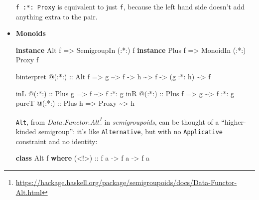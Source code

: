 \documentclass[]{article}
\newenvironment{Shaded}{}{}
\newcommand{\DataTypeTok}[1]{\textcolor[rgb]{0.56,0.13,0.00}{#1}}
\newcommand{\KeywordTok}[1]{\textcolor[rgb]{0.00,0.44,0.13}{\textbf{#1}}}
\newcommand{\NormalTok}[1]{#1}
\newcommand{\OperatorTok}[1]{\textcolor[rgb]{0.40,0.40,0.40}{#1}}
\newcommand{\OtherTok}[1]{\textcolor[rgb]{0.00,0.44,0.13}{#1}}
\renewcommand{\href}[2]{#2\footnote{\url{#1}}}
\begin{document}
\begin{itemize}
  \texttt{f\ :*:\ Proxy} is equivalent to just \texttt{f}, because the left hand
  side doesn't add anything extra to the pair.
\item
  \textbf{Monoids}

\begin{Shaded}
\begin{Highlighting}[]
\KeywordTok{instance} \DataTypeTok{Alt}\NormalTok{  f }\OtherTok{=>} \DataTypeTok{SemigroupIn}\NormalTok{ (}\OperatorTok{:*:}\NormalTok{) f}
\KeywordTok{instance} \DataTypeTok{Plus}\NormalTok{ f }\OtherTok{=>} \DataTypeTok{MonoidIn}\NormalTok{    (}\OperatorTok{:*:}\NormalTok{) }\DataTypeTok{Proxy}\NormalTok{ f}

\NormalTok{binterpret }\OperatorTok{@}\NormalTok{(}\OperatorTok{:*:}\NormalTok{)}
\OtherTok{    ::} \DataTypeTok{Alt}\NormalTok{ f}
    \OtherTok{=>}\NormalTok{ g }\OperatorTok{\textasciitilde{}>}\NormalTok{ f}
    \OtherTok{{-}>}\NormalTok{ h }\OperatorTok{\textasciitilde{}>}\NormalTok{ f}
    \OtherTok{{-}>}\NormalTok{ (g }\OperatorTok{:*:}\NormalTok{ h) }\OperatorTok{\textasciitilde{}>}\NormalTok{ f}

\NormalTok{inL   }\OperatorTok{@}\OtherTok{(:*:) ::} \DataTypeTok{Plus}\NormalTok{ g }\OtherTok{=>}\NormalTok{ f     }\OperatorTok{\textasciitilde{}>}\NormalTok{ f }\OperatorTok{:*:}\NormalTok{ g}
\NormalTok{inR   }\OperatorTok{@}\OtherTok{(:*:) ::} \DataTypeTok{Plus}\NormalTok{ f }\OtherTok{=>}\NormalTok{ g     }\OperatorTok{\textasciitilde{}>}\NormalTok{ f }\OperatorTok{:*:}\NormalTok{ g}
\NormalTok{pureT }\OperatorTok{@}\OtherTok{(:*:) ::} \DataTypeTok{Plus}\NormalTok{ h }\OtherTok{=>} \DataTypeTok{Proxy} \OperatorTok{\textasciitilde{}>}\NormalTok{ h}
\end{Highlighting}
\end{Shaded}

  \texttt{Alt}, from
  \emph{\href{https://hackage.haskell.org/package/semigroupoids/docs/Data-Functor-Alt.html}{Data.Functor.Alt}}
  in \emph{semigroupoids}, can be thought of a ``higher-kinded semigroup'': it's
  like \texttt{Alternative}, but with no \texttt{Applicative} constraint and no
  identity:

\begin{Shaded}
\begin{Highlighting}[]
\KeywordTok{class} \DataTypeTok{Alt}\NormalTok{ f }\KeywordTok{where}
\OtherTok{    (<!>) ::}\NormalTok{ f a }\OtherTok{{-}>}\NormalTok{ f a }\OtherTok{{-}>}\NormalTok{ f a}
\end{Highlighting}
\end{Shaded}


\end{itemize}
\end{document}
